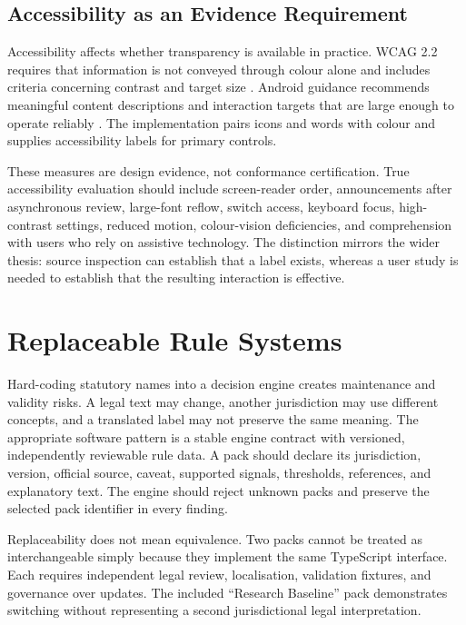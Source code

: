 \subsection{Accessibility as an Evidence Requirement}

Accessibility affects whether transparency is available in practice. WCAG 2.2 requires that information is not conveyed through colour alone and includes criteria concerning contrast and target size \cite{wcag22}. Android guidance recommends meaningful content descriptions and interaction targets that are large enough to operate reliably \cite{androidAccessibility}. The implementation pairs icons and words with colour and supplies accessibility labels for primary controls.

These measures are design evidence, not conformance certification. True accessibility evaluation should include screen-reader order, announcements after asynchronous review, large-font reflow, switch access, keyboard focus, high-contrast settings, reduced motion, colour-vision deficiencies, and comprehension with users who rely on assistive technology. The distinction mirrors the wider thesis: source inspection can establish that a label exists, whereas a user study is needed to establish that the resulting interaction is effective.

\section{Replaceable Rule Systems}

Hard-coding statutory names into a decision engine creates maintenance and validity risks. A legal text may change, another jurisdiction may use different concepts, and a translated label may not preserve the same meaning. The appropriate software pattern is a stable engine contract with versioned, independently reviewable rule data. A pack should declare its jurisdiction, version, official source, caveat, supported signals, thresholds, references, and explanatory text. The engine should reject unknown packs and preserve the selected pack identifier in every finding.

Replaceability does not mean equivalence. Two packs cannot be treated as interchangeable simply because they implement the same TypeScript interface. Each requires independent legal review, localisation, validation fixtures, and governance over updates. The included ``Research Baseline'' pack demonstrates switching without representing a second jurisdictional legal interpretation.

